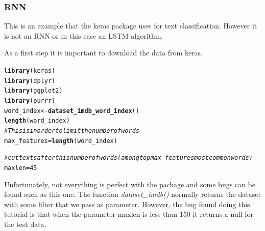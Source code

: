 \documentclass[letter,8pt]{article}\usepackage[]{graphicx}\usepackage[]{color}
\makeatletter
\newcommand{\hlnum}[1]{\textcolor[rgb]{0.686,0.059,0.569}{#1}}%
\newcommand{\hlcom}[1]{\textcolor[rgb]{0.678,0.584,0.686}{\textit{#1}}}%
\newcommand{\hlstd}[1]{\textcolor[rgb]{0.345,0.345,0.345}{#1}}%
\newcommand{\hlkwb}[1]{\textcolor[rgb]{0.69,0.353,0.396}{#1}}%
\newcommand{\hlkwd}[1]{\textcolor[rgb]{0.737,0.353,0.396}{\textbf{#1}}}%
\newenvironment{kframe}{%
 \def\at@end@of@kframe{}%
 \ifinner\ifhmode%
  \def\at@end@of@kframe{\end{minipage}}%
  \begin{minipage}{\columnwidth}%
 \fi\fi%
 \def\FrameCommand##1{\hskip\@totalleftmargin \hskip-\fboxsep
 \colorbox{shadecolor}{##1}\hskip-\fboxsep
     \hskip-\linewidth \hskip-\@totalleftmargin \hskip\columnwidth}%
 \MakeFramed {\advance\hsize-\width
   \@totalleftmargin\z@ \linewidth\hsize
   \@setminipage}}%
 {\par\unskip\endMakeFramed%
 \at@end@of@kframe}
\newenvironment{knitrout}{}{} %
\makeatother
\begin{document}
\subsubsection{RNN}


This is an example that the keras package uses for text classification. However it is not an RNN or in this case an LSTM algorithm.

As a first step it is important to download the data from keras.
\begin{knitrout}
\color{fgcolor}\begin{kframe}
\begin{alltt}
\hlkwd{library}\hlstd{(keras)}
\hlkwd{library}\hlstd{(dplyr)}
\hlkwd{library}\hlstd{(ggplot2)}
\hlkwd{library}\hlstd{(purrr)}
\hlstd{word_index} \hlkwb{<-} \hlkwd{dataset_imdb_word_index}\hlstd{()}
\hlkwd{length}\hlstd{(word_index)}
\hlcom{# This is in order to limit the number of words }
\hlstd{max_features} \hlkwb{=} \hlkwd{length}\hlstd{(word_index)}

\hlcom{# cut texts after this number of words (among top max_features most common words)}
\hlstd{maxlen} \hlkwb{=} \hlnum{45}
\end{alltt}
\end{kframe}
\end{knitrout}
Unfortunately, not everything is perfect with the package and some bugs can be found such as this one. The function \textit{dataset\_imdb()} normally returns the dataset with some filter that we pass as parameter. However, the bug\cite{bugRNNkeras} found doing this tutorial is that when the parameter maxlen is less than 150 it returns a null for the test data.
\end{document}
